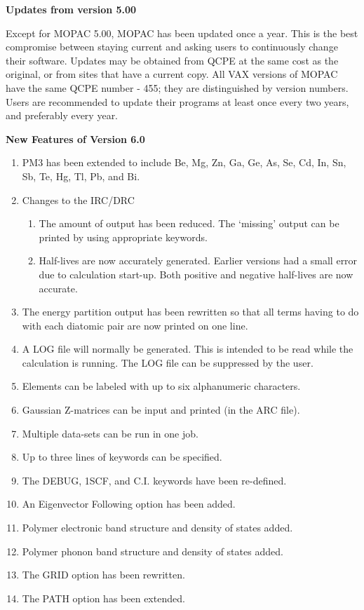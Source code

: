 \begin{center}{\Large\bf Updates from version 5.00}\end{center}

      Except for MOPAC 5.00, MOPAC has  been  updated  once  a  year.
 This is the best compromise between staying current and asking users
 to continuously change their software.  Updates may be obtained from
 QCPE  at  the  same  cost as the original, or from sites that have a
 current copy.  All VAX versions of MOPAC have the same QCPE number -
 455;   they   are  distinguished  by  version  numbers.   Users  are
 recommended to update their programs at least once every two  years,
 and preferably every year.

\begin{center}{\Large\bf New Features of Version 6.0}\end{center}
\begin{enumerate}
\item PM3 has been extended to include Be, Mg, Zn, Ga, Ge, As, Se, Cd,
 In, Sn, Sb, Te, Hg, Tl, Pb, and Bi.
\item Changes to the IRC/DRC
 \begin{enumerate}
 \item The amount of output has been reduced.  The `missing' output
      can be printed by using appropriate keywords.
 \item Half-lives are now accurately generated.   Earlier  versions
      had  a  small  error  due  to  calculation  start-up.   Both
      positive and negative half-lives are now accurate.
 \end{enumerate}
\item The energy partition output has been rewritten so that all terms
 having  to  do  with  each  diatomic pair are now printed on one
 line.
\item A LOG file will normally be generated.  This is intended  to  be
 read  while  the  calculation  is  running.  The LOG file can be
 suppressed by the user.
\item Elements can be labeled with up to six alphanumeric characters.
\item Gaussian Z-matrices can be input and printed (in the ARC file).
\item Multiple data-sets can be run in one job.
\item Up to three lines of keywords can be specified.
\item The DEBUG, 1SCF, and C.I. keywords have been re-defined.
\item An Eigenvector Following option has been added.
\item Polymer electronic band structure and density of states added.
\item Polymer phonon band structure and density of states added.
\item The GRID option has been rewritten.
\item The PATH option has been extended.
\end{enumerate}

